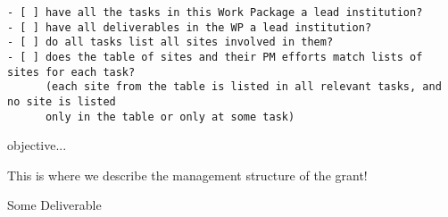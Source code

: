 \begin{draft}
\begin{verbatim}
- [ ] have all the tasks in this Work Package a lead institution?
- [ ] have all deliverables in the WP a lead institution?
- [ ] do all tasks list all sites involved in them?
- [ ] does the table of sites and their PM efforts match lists of sites for each task?
      (each site from the table is listed in all relevant tasks, and no site is listed
      only in the table or only at some task)
\end{verbatim}
\end{draft}

\begin{workpackage}[id=management,type=MGT,wphases=0-48!.2,
  title=Project Management,
  short=Management,
  lead=SRL,
  EGIRM=4,
  INSERMRM=4,
  QSRM=4,
  SILRM=4,
  SRLRM=24,
  UIORM=4,
  UPSUDRM=4,
  WTTRM=4,
  XFELRM=4,
  swsites
]
\begin{wpobjectives}
 \begin{compactitem}
   \item objective...
 \end{compactitem}
\end{wpobjectives}

\begin{wpdescription}

This is where we describe the management structure of the grant!

\end{wpdescription}

\begin{tasklist}
% 

\end{tasklist}


\begin{wpdelivs}
\begin{wpdeliv}[due=1,miles=startup,id=infrastructure,dissem=PU,nature=DEC,lead=SRL]
  {Some Deliverable}
\end{wpdeliv}

\end{wpdelivs}
\end{workpackage}

